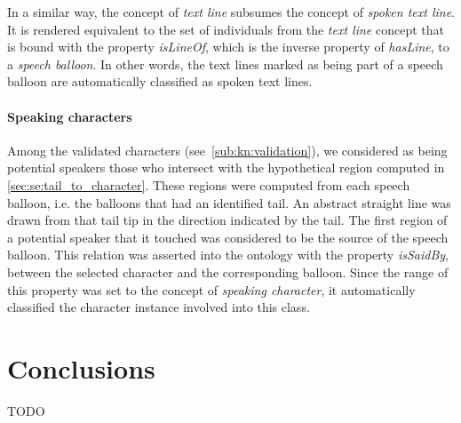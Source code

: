In a similar way, the concept of \textit{text line} subsumes the concept of \textit{spoken text line}.
It is rendered equivalent to the set of individuals from the \textit{text line} concept that is bound with the property \textit{isLineOf}, which is the inverse property of \textit{hasLine}, to a \textit{speech balloon}.
In other words, the text lines marked as being part of a speech balloon are automatically classified as spoken text lines.


\paragraph{Speaking characters} %
\label{sub:inference_of_the_speaking_characters}
Among the validated characters (see~\ref{sub:kn:validation}), we considered as being potential speakers those who intersect with the hypothetical region computed in \ref{sec:se:tail_to_character}.
These regions were computed from each speech balloon, i.e. the balloons that had an identified tail.
An abstract straight line was drawn from that tail tip in the direction indicated by the tail.
The first region of a potential speaker that it touched was considered to be the source of the speech balloon.
This relation was asserted into the ontology with the property \textit{isSaidBy}, between the selected character and the corresponding balloon.
Since the range of this property was set to the concept of \textit{speaking character}, it automatically classified the character instance involved into this class.



\section{Conclusions}
\label{sec:kn:conclusion}

TODO